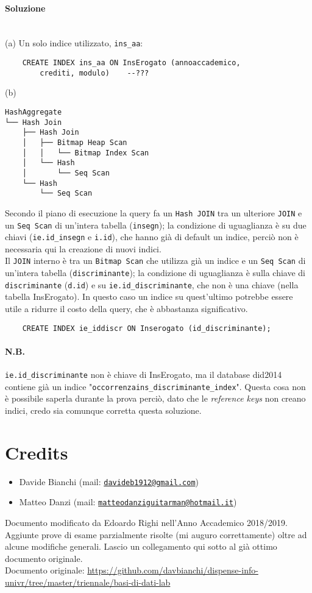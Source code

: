 \documentclass[a4paper, 10pt, titlepage]{article}
\newcommand{\mail}[1]{\href{mailto:#1}{\texttt{#1}}}
\begin{document}
\paragraph{Soluzione}\dotfill
\\(a) Un solo indice utilizzato, \lstinline|ins_aa|:
\begin{lstlisting}
	CREATE INDEX ins_aa ON InsErogato (annoaccademico, 
		crediti, modulo)	--???
\end{lstlisting}
(b) 
\begin{verbatim}
HashAggregate
└── Hash Join
    ├── Hash Join
    │   ├── Bitmap Heap Scan
    │   │   └── Bitmap Index Scan
    │   └── Hash
    │       └── Seq Scan
    └── Hash
        └── Seq Scan
\end{verbatim}
Secondo il piano di esecuzione la query fa un \lstinline|Hash JOIN| tra un ulteriore \lstinline|JOIN| e un \lstinline|Seq Scan| di un'intera tabella (\lstinline|insegn|); la condizione di uguaglianza è su due chiavi (\lstinline|ie.id_insegn| e \lstinline|i.id|), che hanno già di default un indice, perciò non è necessaria qui la creazione di nuovi indici.\\
Il \lstinline|JOIN| interno è tra un \lstinline|Bitmap Scan| che utilizza già un indice e un \lstinline|Seq Scan| di un'intera tabella (\lstinline|discriminante|); la condizione di uguaglianza è sulla chiave di \lstinline|discriminante| (\lstinline|d.id|) e su \lstinline|ie.id_discriminante|, che non è una chiave (nella tabella InsErogato). In questo caso un indice su quest'ultimo potrebbe essere utile a ridurre il costo della query, che è abbastanza significativo.
\begin{lstlisting}
	CREATE INDEX ie_iddiscr ON Inserogato (id_discriminante);
\end{lstlisting}
\paragraph{N.B.} \lstinline|ie.id_discriminante| non è chiave di InsErogato, ma il database did2014 contiene già un indice "\lstinline|occorrenzains_discriminante_index|". Questa cosa non è possibile saperla durante la prova perciò, dato che le \textit{reference keys} non creano indici, credo sia comunque corretta questa soluzione.
\newpage

\section{Credits}
\begin{itemize}
\item Davide Bianchi (mail: \mail{davideb1912@gmail.com})
\item Matteo Danzi (mail: \mail{matteodanziguitarman@hotmail.it})
\end{itemize}
Documento modificato da Edoardo Righi nell'Anno Accademico 2018/2019. Aggiunte prove di esame parzialmente risolte (mi auguro correttamente) oltre ad alcune modifiche generali. Lascio un collegamento qui sotto al già ottimo documento originale. \medskip \\
Documento originale: {\scriptsize \url{https://github.com/davbianchi/dispense-info-univr/tree/master/triennale/basi-di-dati-lab}}
			
\end{document}
